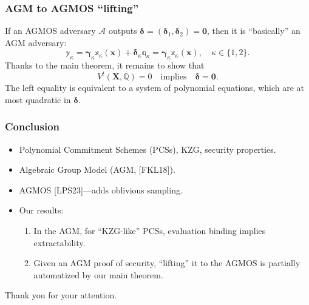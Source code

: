 \documentclass[9pt]{beamer}
\newcommand{\A}{\mathcal A}  %
\begin{document}
\begin{frame}
\frametitle{AGM to AGMOS ``lifting''}
If an AGMOS adversary $ \A $ outputs $ \bm \delta = (\bm \delta_1, \bm \delta_2) = \bm 0 $, then it is ``basically'' an AGM adversary:
\[
\mathbb y_\kappa = 
\bm{\gamma}_\kappa \mathbb x_\kappa(\bm x) + \bm \delta_\kappa \mathbb q_\kappa = 
\bm{\gamma}_\kappa \mathbb x_\kappa(\bm x), \quad 
\kappa \in \{ 1, 2 \}.
\]
Thanks to the main theorem, it remains to show that
\[
V^t(\bm X, \mathbb Q) = 0 \quad \text{implies} \quad
\bm \delta = \bm 0.
\]
The left equality is equivalent to a system of polynomial equations, which are at most quadratic in $ \bm \delta $. 
\end{frame}


\begin{frame}
\frametitle{Conclusion}
\begin{itemize}
    \item Polynomial Commitment Schemes (PCSs), KZG, security properties.
    \item Algebraic Group Model (AGM, [FKL18]).
    \item AGMOS [LPS23]---adds oblivious sampling.
    \item Our results:
    \begin{enumerate}
        \item In the AGM, for ``KZG-like'' PCSs, evaluation binding implies extractability.
        \item Given an AGM proof of security, ``lifting'' it to the AGMOS is partially automatized by our main theorem.
    \end{enumerate}
\end{itemize}
\vfill
Thank you for your attention.
\end{frame}
\end{document}
